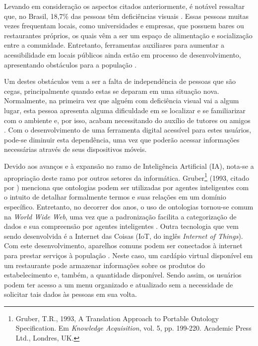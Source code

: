 Levando em consideração os aspectos citados anteriormente, é notável ressaltar que, no Brasil, 18,7\% das pessoas têm deficiências visuais \cite{IBGE2011}. Essas pessoas muitas vezes frequentam locais, como universidades e empresas, que possuem bares ou restaurantes próprios, os quais vêm a ser um espaço de alimentação e socialização entre a comunidade. Entretanto, ferramentas auxiliares para aumentar a acessibilidade em locais públicos ainda estão em processo de desenvolvimento, apresentando obstáculos para a população \cite{PATEL2012}.

Um destes obstáculos vem a ser a falta de independência de pessoas que são cegas, principalmente quando estas se deparam em uma situação nova. Normalmente, na primeira vez que alguém com deficiência visual vai a algum lugar, esta pessoa apresenta alguma dificuldade em se localizar e se familiarizar com o ambiente e, por isso, acabam necessitando do auxílio de tutores ou amigos \cite{DATRI2007}. Com o desenvolvimento de uma ferramenta digital acessível para estes usuários, pode-se diminuir esta dependência, uma vez que poderão acessar informações necessárias através de seus dispositivos móveis.

Devido aos avanços e à expansão no ramo de Inteligência Artificial (IA), nota-se a apropriação deste ramo por outros setores da informática. Gruber\footnote{Gruber, T.R., 1993,  A Translation Approach to Portable Ontology Specification. Em \emph{Knowledge Acquisition}, vol. 5, pp. 199-220. Academic Press Ltd., Londres, UK.} (1993, citado por \cite{NOY2001}) menciona que ontologias podem ser utilizadas por agentes inteligentes com o intuito de detalhar formalmente termos e suas relações em um domínio específico. Entretanto, no decorrer dos anos, o uso de ontologias tornou-se comum na \textit{World Wide Web}, uma vez que a padronização facilita a categorização de dados e sua compreensão por agentes inteligentes \cite{NOY2001}. Outra tecnologia que vem sendo desenvolvida é a Internet das Coisas (IoT, do inglês \emph{Internet of Things}). Com este desenvolvimento, aparelhos comuns podem ser conectados à internet para prestar serviços à população \cite{FRIESS2013} . Neste caso, um cardápio virtual disponível em um restaurante pode armazenar informações sobre os produtos do estabelecimento e, também, a quantidade disponível. Sendo assim, os usuários podem ter acesso a um menu organizado e atualizado sem a necessidade de solicitar tais dados às pessoas em sua volta.


